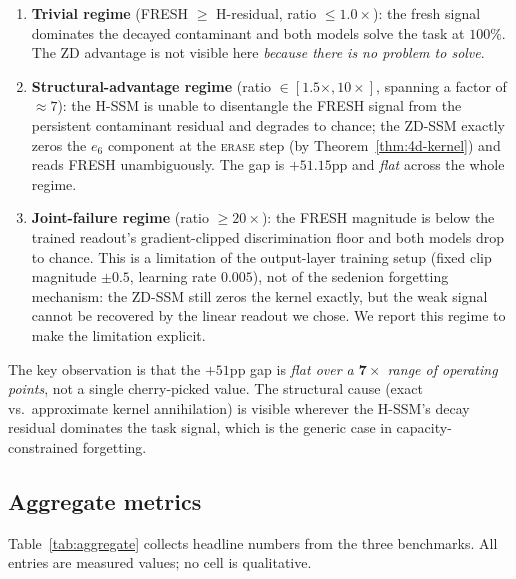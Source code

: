 \documentclass{article}
\begin{document}
\begin{enumerate}
  \item \textbf{Trivial regime} (FRESH $\geq$ H-residual, ratio $\leq 1.0\times$):
  the fresh signal dominates the decayed contaminant and both models solve the
  task at $100\%$. The ZD advantage is not visible here \emph{because there is
  no problem to solve}.
  \item \textbf{Structural-advantage regime}
  (ratio $\in [1.5\times, 10\times]$, spanning a factor of $\approx 7$):
  the H-SSM is unable to disentangle the FRESH signal from the persistent
  contaminant residual and degrades to chance; the ZD-SSM exactly zeros the
  $e_6$ component at the \textsc{erase} step (by
  Theorem~\ref{thm:4d-kernel}) and reads FRESH unambiguously. The gap is
  $+51.15$pp and \emph{flat} across the whole regime.
  \item \textbf{Joint-failure regime} (ratio $\geq 20\times$): the FRESH
  magnitude is below the trained readout's gradient-clipped discrimination
  floor and both models drop to chance. This is a limitation of the
  output-layer training setup (fixed clip magnitude $\pm 0.5$, learning rate
  $0.005$), not of the sedenion forgetting mechanism: the ZD-SSM still zeros
  the kernel exactly, but the weak signal cannot be recovered by the linear
  readout we chose. We report this regime to make the limitation explicit.
\end{enumerate}

The key observation is that the $+51$pp gap is \emph{flat over a
$\mathbf{7\times}$ range of operating points}, not a single cherry-picked
value. The structural cause (exact vs.\ approximate kernel annihilation) is
visible wherever the H-SSM's decay residual dominates the task signal, which
is the generic case in capacity-constrained forgetting.

\subsection{Aggregate metrics}
\label{sec:aggregate}

Table~\ref{tab:aggregate} collects headline numbers from the three
benchmarks. All entries are measured values; no cell is qualitative.
\end{document}
